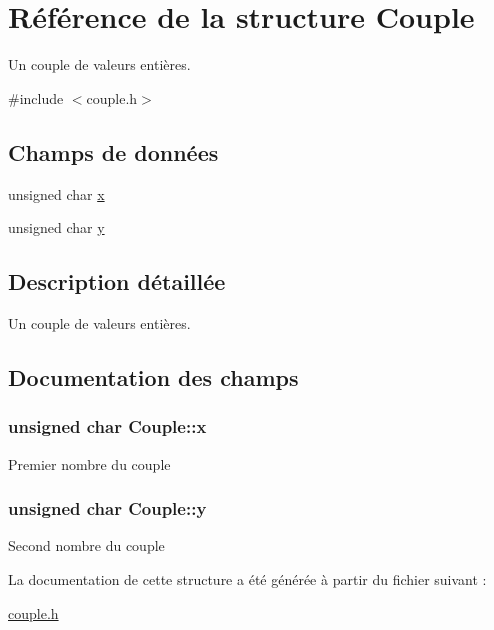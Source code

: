 \hypertarget{structCouple}{\section{Référence de la structure Couple}
\label{structCouple}
}


Un couple de valeurs entières.  




{\ttfamily \#include $<$couple.\-h$>$}

\subsection*{Champs de données}
\begin{DoxyCompactItemize}
\item 
unsigned char \hyperlink{structCouple_aa225e6fa552cce2cdde4b37c3df8b901}{x}
\item 
unsigned char \hyperlink{structCouple_a19735721485dbefa8f88737adff3293b}{y}
\end{DoxyCompactItemize}


\subsection{Description détaillée}
Un couple de valeurs entières. 

\subsection{Documentation des champs}
\hypertarget{structCouple_aa225e6fa552cce2cdde4b37c3df8b901}{
\subsubsection[{x}]{\setlength{\rightskip}{0pt plus 5cm}unsigned char Couple\-::x}}\label{structCouple_aa225e6fa552cce2cdde4b37c3df8b901}
Premier nombre du couple \hypertarget{structCouple_a19735721485dbefa8f88737adff3293b}{
\subsubsection[{y}]{\setlength{\rightskip}{0pt plus 5cm}unsigned char Couple\-::y}}\label{structCouple_a19735721485dbefa8f88737adff3293b}
Second nombre du couple 

La documentation de cette structure a été générée à partir du fichier suivant \-:\begin{DoxyCompactItemize}
\item 
\hyperlink{couple_8h}{couple.\-h}\end{DoxyCompactItemize}
